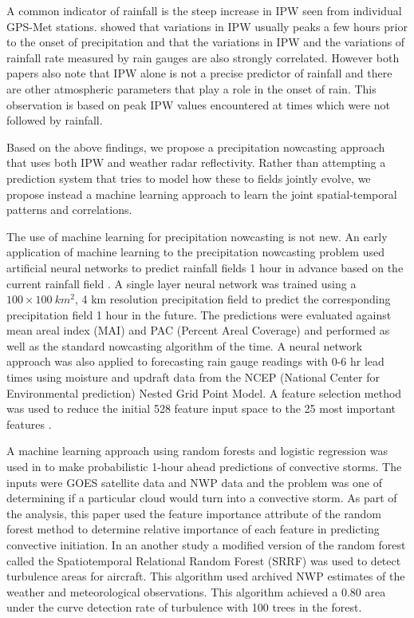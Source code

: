 \documentclass[proposal]{umassthesis}
\begin{document}
A common indicator of rainfall is the steep increase in IPW seen from individual GPS-Met stations. \cite{shi2015real} \cite{akilan2015gps} showed that variations in IPW usually peaks a few hours prior to the onset of precipitation and that the variations in IPW and the variations of rainfall rate measured by rain gauges are also strongly correlated. However both papers also note that IPW alone is not a precise predictor of rainfall and there are other atmospheric parameters that play a role in the onset of rain. This observation is based on peak IPW values encountered at times which were not followed by rainfall.  
 
 Based on the above findings, we propose a precipitation nowcasting approach that uses both IPW and weather radar reflectivity. Rather than attempting a prediction system that tries to model how these to fields jointly evolve, we propose instead a machine learning approach to learn the joint spatial-temporal patterns and correlations.

The use of machine learning for precipitation nowcasting is not new. An early application of machine learning to the precipitation nowcasting problem used artificial neural networks to predict rainfall fields 1 hour in advance based on the current rainfall field \cite{french1992rainfall}. A single layer neural network was trained using a $100 \times 100 \ km^{2}$, 4 km resolution precipitation field to predict the corresponding precipitation field 1 hour in the future. The predictions were evaluated against mean areal index (MAI) and PAC (Percent Areal Coverage) and performed as well as the standard nowcasting algorithm of the time. A neural network approach was also applied to forecasting rain gauge readings with 0-6 hr lead times using moisture and updraft data from the NCEP (National Center for Environmental prediction) Nested Grid Point Model. A feature selection method was used to reduce the initial 528 feature input space to the 25 most important features \cite{kuligowski1998localized}.

A machine learning approach using random forests and logistic regression was used in \cite{mecikalski2015probabilistic} to make probabilistic 1-hour ahead predictions of convective storms. The inputs were GOES satellite data and NWP data and the problem was one of determining if a particular cloud would turn into a convective storm. As part of the analysis, this paper used the feature importance attribute of the random forest method to determine relative importance of each feature in predicting convective initiation. In an another study a modified version of the random forest called the Spatiotemporal Relational Random Forest (SRRF) \cite{mcgovern2010understanding} was used to detect turbulence areas for aircraft. This algorithm used archived NWP estimates of the weather and meteorological observations. This algorithm achieved a 0.80 area under the curve detection rate of turbulence with 100 trees in the forest.
\end{document}

